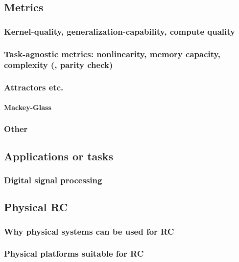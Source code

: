 \subsection{Metrics}
\subsubsection{Kernel-quality, generalization-capability, compute quality}
\subsubsection{Task-agnostic metrics: nonlinearity, memory capacity, complexity (, parity check)}
\subsubsection{Attractors etc.} %
\paragraph{Mackey-Glass}
\subsubsection{Other} %
\subsection{Applications or tasks}
\subsubsection{Digital signal processing} %
\subsection{Physical RC}
\subsubsection{Why physical systems can be used for RC}
\subsubsection{Physical platforms suitable for RC}
